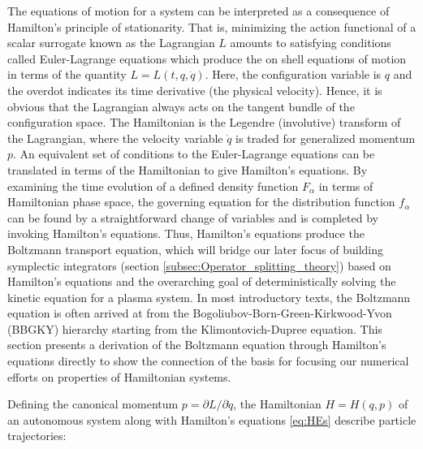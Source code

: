 \documentclass[11pt,titlepage]{report}
\begin{document}
\indent\indent The equations of motion for a system can be interpreted as a consequence of Hamilton's principle of stationarity. That is, minimizing the action functional of a scalar surrogate known as the Lagrangian $L$ amounts to satisfying conditions called Euler-Lagrange equations which produce the on shell equations of motion in terms of the quantity $L = L(t, q,\dot{q})$. Here, the configuration variable is $q$ and the overdot indicates its time derivative (the physical velocity). Hence, it is obvious that the Lagrangian always acts on the tangent bundle of the configuration space. The Hamiltonian is the Legendre (involutive) transform of the Lagrangian, where the velocity variable $\dot{q}$ is traded for generalized momentum $p$. An equivalent set of conditions to the Euler-Lagrange equations can be translated in terms of the Hamiltonian to give Hamilton's equations. By examining the time evolution of a defined density function $F_{\alpha}$ in terms of Hamiltonian phase space, the governing equation for the distribution function $f_{\alpha}$ can be found by a straightforward change of variables and is completed by invoking  Hamilton's equations. Thus, Hamilton's equations produce the Boltzmann transport equation, which will bridge our later focus of building symplectic integrators (section \ref{subsec:Operator_splitting_theory}) based on Hamilton's equations and the overarching goal of deterministically solving the kinetic equation for a plasma system. In most introductory texts, the Boltzmann equation is often arrived at from the Bogoliubov-Born-Green-Kirkwood-Yvon (BBGKY) hierarchy starting from the Klimontovich-Dupree equation. This section presents a derivation of the Boltzmann equation through Hamilton's equations \cite{Miyamoto} directly to show the connection of the basis for focusing our numerical efforts on properties of Hamiltonian systems.

Defining the canonical momentum $p = \partial L / \partial \dot{q}$, the Hamiltonian $H = H(q,p)$ of an autonomous system along with Hamilton's equations \eqref{eq:HEs} describe particle trajectories:

\end{document}
